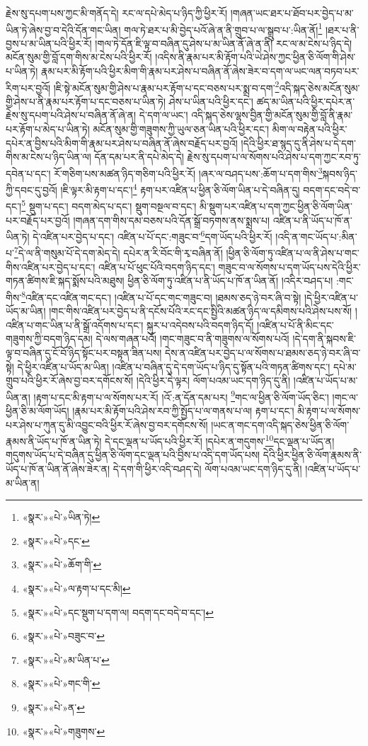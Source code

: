 རྗེས་སུ་དཔག་པས་ཀྱང་མི་གནོད་དེ། རང་ལ་དཔེ་མེད་པ་ཉིད་ཀྱི་ཕྱིར་རོ། །གཞན་ཡང་ཐར་པ་ཐོབ་པར་བྱེད་པ་མ་ཡིན་ཏེ་ཞེས་བྱ་བ་དེའི་དོན་གང་ཡིན། གལ་ཏེ་ཐར་པ་མི་བྱེད་པའོ་ཞེ་ན་ནི་གྲུབ་པ་ལ་སྒྲུབ་པ་:ཡིན་ནོ།\footnote{«སྣར་»«པེ་»ཡིན་ཏེ།} །ཐར་པ་ནི་བྱས་པ་མ་ཡིན་པའི་ཕྱིར་རོ། །གལ་ཏེ་དོན་ཇི་ལྟ་བ་བཞིན་དུ་ཤེས་པ་མ་ཡིན་ནོ་ཞེ་ན་ནི། རང་ལ་མ་ངེས་པ་ཉིད་དེ། མངོན་སུམ་གྱི་བློ་དག་གིས་མ་ངེས་པའི་ཕྱིར་རོ། །འདིས་ནི་རྣམ་པར་མི་རྟོག་པའི་ཡེ་ཤེས་ཀྱང་ཕྱིན་ཅི་ལོག་གི་ཤེས་པ་ཡིན་ཏེ། རྣམ་པར་མི་རྟོག་པའི་ཕྱིར་མིག་གི་རྣམ་པར་ཤེས་པ་བཞིན་ནོ་ཞེས་ཟེར་བ་དག་ལ་ཡང་ལན་བཏབ་པར་རིག་པར་བྱའོ། །ཇི་སྟེ་མངོན་སུམ་གྱི་ཤེས་པ་རྣམ་པར་རྟོག་པ་དང་བཅས་པར་སྨྲ་བ་དག་\footnote{«སྣར་»«པེ་»དང་}འདི་སྐད་ཅེས་མངོན་སུམ་གྱི་ཤེས་པ་ནི་རྣམ་པར་རྟོག་པ་དང་བཅས་པ་ཡིན་ཏེ། ཤེས་པ་ཡིན་པའི་ཕྱིར་དང་། ཚད་མ་ཡིན་པའི་ཕྱིར་དཔེར་ན་རྗེས་སུ་དཔག་པའི་ཤེས་པ་བཞིན་ནོ་ཞེ་ན། དེ་དག་ལ་ཡང་། འདི་སྐད་ཅེས་ལྷས་བྱིན་གྱི་མངོན་སུམ་གྱི་བློ་ནི་རྣམ་པར་རྟོག་པ་མེད་པ་ཡིན་ཏེ། མངོན་སུམ་གྱི་གཟུགས་ཀྱི་ཡུལ་ཅན་ཡིན་པའི་ཕྱིར་དང་། མིག་ལ་བརྟེན་པའི་ཕྱིར་དཔེར་ན་བྱིས་པའི་མིག་གི་རྣམ་པར་ཤེས་པ་བཞིན་ནོ་ཞེས་བརྗོད་པར་བྱའོ། །དེའི་ཕྱིར་ཐ་སྙད་དུ་ནི་ཤེས་པ་དེ་དག་གིས་མ་ངེས་པ་ཉིད་ཡིན་ལ། དོན་དམ་པར་ནི་དཔེ་མེད་དེ། རྗེས་སུ་དཔག་པ་ལ་སོགས་པའི་ཤེས་པ་དག་ཀྱང་རབ་ཏུ་དབེན་པ་དང་། རོ་གཅིག་པས་མཚན་ཉིད་གཅིག་པའི་ཕྱིར་རོ། །ཞར་ལ་བཤད་པས་:ཆོག་པ་དག་གིས་\footnote{«སྣར་»«པེ་»ཆོག་གི་}སྐབས་ཉིད་ཀྱི་དབང་དུ་བྱའོ། །ཇི་ལྟར་མི་རྟག་པ་དང་།\footnote{«སྣར་»«པེ་»ལ་རྟག་པ་དང་མི།} རྟག་པར་འཛིན་པ་ཕྱིན་ཅི་ལོག་ཡིན་པ་དེ་བཞིན་དུ། བདག་དང་བདེ་བ་དང་།\footnote{«སྣར་»«པེ་»དང་སྡུག་པ་དག་ལ། བདག་དང་བདེ་བ་དང་།} སྡུག་པ་དང་། བདག་མེད་པ་དང་། སྡུག་བསྔལ་བ་དང་། མི་སྡུག་པར་འཛིན་པ་དག་ཀྱང་ཕྱིན་ཅི་ལོག་ཡིན་པར་བརྗོད་པར་བྱའོ། །གཞན་དག་གིས་དམ་བཅས་པའི་དོན་སྒྲོ་བཏགས་ནས་སྨྲས་པ། འཛིན་པ་ནི་ཡོད་པ་ཁོ་ན་ཡིན་ཏེ། དེ་འཛིན་པར་བྱེད་པ་དང་། འཛིན་པ་པོ་དང་:གཟུང་བ་\footnote{«སྣར་»«པེ་»བཟུང་བ་}དག་ཡོད་པའི་ཕྱིར་རོ། །འདི་ན་གང་ཡོད་པ་:མིན་པ་\footnote{«སྣར་»«པེ་»མ་ཡིན་པ་}དེ་ལ་ནི་གསུམ་པོ་དེ་དག་མེད་དེ། དཔེར་ན་རི་བོང་གི་རྭ་བཞིན་ནོ། །ཕྱིན་ཅི་ལོག་ཏུ་འཛིན་པ་ལ་ནི་ཤེས་པ་གང་གིས་འཛིན་པར་བྱེད་པ་དང་། འཛིན་པ་པོ་ཕུང་པོའི་བདག་ཉིད་དང་། གཟུང་བ་ལ་སོགས་པ་དག་ཡོད་པས་དེའི་ཕྱིར་གཏན་ཚིགས་ཇི་སྐད་སྨོས་པའི་མཐུས། ཕྱིན་ཅི་ལོག་ཏུ་འཛིན་པ་ནི་ཡོད་པ་ཁོ་ན་ཡིན་ནོ། །འདིར་བཤད་པ། :གང་གིས་\footnote{«སྣར་»«པེ་»གང་གི་}འཛིན་དང་འཛིན་གང་དང་། །འཛིན་པ་པོ་དང་གང་གཟུང་བ། །ཐམས་ཅད་ཉེ་བར་ཞི་བ་སྟེ། །དེ་ཕྱིར་འཛིན་པ་ཡོད་མ་ཡིན། །གང་གིས་འཛིན་པར་བྱེད་པ་ནི་དངོས་པོའི་རང་དང་སྤྱིའི་མཚན་ཉིད་ལ་དམིགས་པའི་ཤེས་པས་སོ། །འཛིན་པ་གང་ཡིན་པ་ནི་སྒྲོ་འདོགས་པ་དང་། སྐུར་པ་འདེབས་པའི་བདག་ཉིད་དོ། །འཛིན་པ་པོ་ནི་མིང་དང་གཟུགས་ཀྱི་བདག་ཉིད་དམ། དེ་ལས་གཞན་པའོ། །གང་གཟུང་བ་ནི་གཟུགས་ལ་སོགས་པའོ། །དེ་དག་ནི་སྐབས་ཇི་ལྟ་བ་བཞིན་དུ་ངོ་བོ་ཉིད་སྟོང་པར་བསྟན་ཟིན་པས། དེས་ན་འཛིན་པར་བྱེད་པ་ལ་སོགས་པ་ཐམས་ཅད་ཉེ་བར་ཞི་བ་སྟེ། དེ་ཕྱིར་འཛིན་པ་ཡོད་མ་ཡིན། །འཛིན་པ་བཞིན་དུ་དེ་དག་ཡོད་པ་ཉིད་དུ་སྟོན་པའི་གཏན་ཚིགས་དང་། དཔེ་མ་གྲུབ་པའི་ཕྱིར་རོ་ཞེས་བྱ་བར་དགོངས་སོ། །དེའི་ཕྱིར་དེ་ལྟར། ལོག་པའམ་ཡང་དག་ཉིད་དུ་ནི། །འཛིན་པ་ཡོད་པ་མ་ཡིན་ན། །རྟག་པ་དང་མི་རྟག་པ་ལ་སོགས་པར་རོ། །འོ་:ན་དོན་དམ་པར། \footnote{«སྣར་»«པེ་»ན་}གང་ལ་ཕྱིན་ཅི་ལོག་ཡོད་ཅིང་། །གང་ལ་ཕྱིན་ཅི་མ་ལོག་ཡོད། །རྣམ་པར་མི་རྟོག་པའི་ཤེས་རབ་ཀྱི་སྤྱོད་པ་ལ་གནས་པ་ལ། རྟག་པ་དང་། མི་རྟག་པ་ལ་སོགས་པར་ཤེས་པ་ཀུན་དུ་མི་འབྱུང་བའི་ཕྱིར་རོ་ཞེས་བྱ་བར་དགོངས་སོ། །ཡང་ན་གང་དག་འདི་སྐད་ཅེས་ཕྱིན་ཅི་ལོག་རྣམས་ནི་ཡོད་པ་ཁོ་ན་ཡིན་ཏེ། དེ་དང་ལྡན་པ་ཡོད་པའི་ཕྱིར་རོ། །དཔེར་ན་གདུགས་\footnote{«སྣར་»«པེ་»གཟུགས་}དང་ལྡན་པ་ཡོད་ན། གདུགས་ཡོད་པ་དེ་བཞིན་དུ་ཕྱིན་ཅི་ལོག་དང་ལྡན་པའི་བྱིས་པ་འདི་དག་ཡོད་པས། དེའི་ཕྱིར་ཕྱིན་ཅི་ལོག་རྣམས་ནི་ཡོད་པ་ཁོ་ན་ཡིན་ནོ་ཞེས་ཟེར་ན། དེ་དག་གི་ཕྱིར་འདི་བཤད་དེ། ལོག་པའམ་ཡང་དག་ཉིད་དུ་ནི། །འཛིན་པ་ཡོད་པ་མ་ཡིན་ན། 